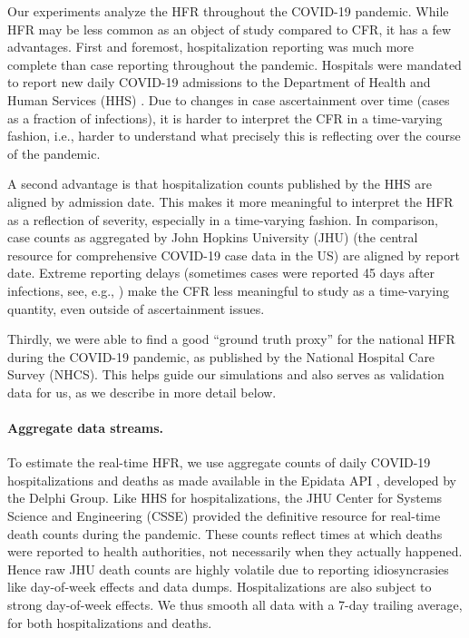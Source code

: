 \documentclass{article}
\begin{document}
Our experiments analyze the HFR throughout the COVID-19 pandemic. While HFR 
may be less common as an object of study compared to CFR, it has a few
advantages. First and foremost, hospitalization reporting was much more complete
than case reporting throughout the pandemic. Hospitals were mandated to report
new daily COVID-19 admissions to the Department of Health and Human Services
(HHS) \citep{HHS2023}. Due to changes in case ascertainment over time (cases as
a fraction of infections), it is harder to interpret the CFR in a time-varying
fashion, i.e., harder to understand what precisely this is reflecting over the
course of the pandemic.  

A second advantage is that hospitalization counts published by the HHS are
aligned by admission date. This makes it more meaningful to interpret the HFR as
a reflection of severity, especially in a time-varying fashion. In comparison,
case counts as aggregated by John Hopkins University (JHU) \citep{JHU} (the
central resource for comprehensive COVID-19 case data in the US) are aligned by
report date. Extreme reporting delays (sometimes cases were reported 45 days
after infections, see, e.g., \citealp{Jahja2022}) make the CFR less meaningful
to study as a time-varying quantity, even outside of ascertainment issues.  


Thirdly, we were able to find a good ``ground truth proxy'' for the national HFR 
during the COVID-19 pandemic, as published by the National Hospital Care Survey
(NHCS). This helps guide our simulations and also serves as validation data for
us, as we describe in more detail below.  

\paragraph{Aggregate data streams.}

To estimate the real-time HFR, we use aggregate counts of daily COVID-19 
hospitalizations and deaths as made available in the Epidata API
\citep{Epidata}, developed by the Delphi Group. Like HHS for hospitalizations,
the JHU Center for Systems Science and Engineering (CSSE) provided the
definitive resource for real-time death counts during the pandemic. These counts
reflect times at which deaths were reported to health authorities, not
necessarily when they actually happened. Hence raw JHU death counts are highly
volatile due to reporting idiosyncrasies like day-of-week effects and data
dumps. Hospitalizations are also subject to strong day-of-week effects. We
thus smooth all data with a 7-day trailing average, for both hospitalizations
and deaths.   
\end{document}
